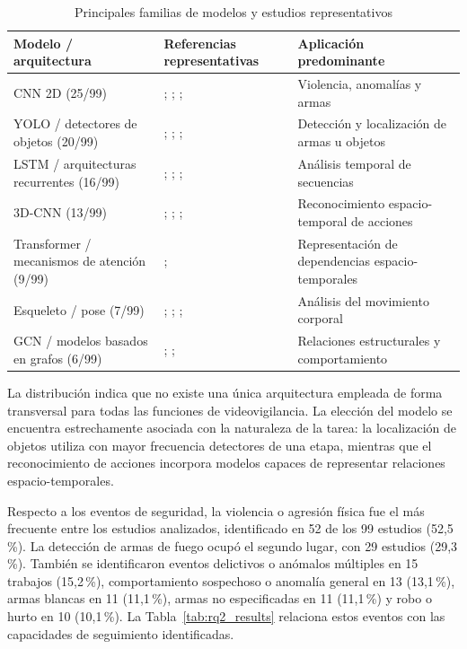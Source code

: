 \documentclass[pdflatex,sn-mathphys-num]{sn-jnl}%
\theoremstyle{thmstyleone}%
\theoremstyle{thmstyletwo}%
\theoremstyle{thmstylethree}%
\begin{document}
\begingroup
\small
\setlength{\tabcolsep}{4pt}
\renewcommand{\arraystretch}{1.15}
\begin{table}[!htbp]
\centering
\caption{Principales familias de modelos y estudios representativos}
\label{tab:rq1_results}
\begin{tabular}{@{}L{3.2cm}L{5.0cm}L{4.1cm}@{}}
\toprule
\textbf{Modelo / arquitectura} & \textbf{Referencias representativas} & \textbf{Aplicación predominante} \\
\midrule
CNN 2D (25/99) & \citet{ciampi2024}; \citet{ingle2022}; \citet{saleem2022}; \citet{pereatrigo2023} & Violencia, anomalías y armas \\
YOLO / detectores de objetos (20/99) & \citet{munoz2025}; \citet{fierrosilva2026}; \citet{fathy2022}; \citet{dalal2024} & Detección y localización de armas u objetos \\
LSTM / arquitecturas recurrentes (16/99) & \citet{singhal2026}; \citet{ciampi2022}; \citet{pangavhane2025}; \citet{azzakhnini2025} & Análisis temporal de secuencias \\
3D-CNN (13/99) & \citet{singhal2026}; \citet{ciampi2022}; \citet{huszar2023}; \citet{shin2025} & Reconocimiento espacio-temporal de acciones \\
Transformer / mecanismos de atención (9/99) & \citet{ciampi2022}; \citet{shin2025} & Representación de dependencias espacio-temporales \\
Esqueleto / pose (7/99) & \citet{bhavani2025}; \citet{janbi2024}; \citet{muriithi2024}; \citet{garciacobo2023} & Análisis del movimiento corporal \\
GCN / modelos basados en grafos (6/99) & \citet{janbi2024}; \citet{g2025}; \citet{leyva2024} & Relaciones estructurales y comportamiento \\
\bottomrule
\end{tabular}
\end{table}
\FloatBarrier
\endgroup

La distribución indica que no existe una única arquitectura empleada de forma
transversal para todas las funciones de videovigilancia. La elección del modelo se
encuentra estrechamente asociada con la naturaleza de la tarea: la localización de
objetos utiliza con mayor frecuencia detectores de una etapa, mientras que el
reconocimiento de acciones incorpora modelos capaces de representar relaciones
espacio-temporales.

\FloatBarrier
Respecto a los eventos de seguridad, la violencia o agresión física fue el más frecuente entre los estudios analizados,
identificado en 52 de los 99 estudios (52,5\,\%). La detección de armas de fuego
ocupó el segundo lugar, con 29 estudios (29,3\,\%). También se identificaron
eventos delictivos o anómalos múltiples en 15 trabajos (15,2\,\%),
comportamiento sospechoso o anomalía general en 13 (13,1\,\%), armas blancas
en 11 (11,1\,\%), armas no especificadas en 11 (11,1\,\%) y robo o hurto en 10 (10,1\,\%).
La Tabla~\ref{tab:rq2_results} relaciona estos eventos con las capacidades de seguimiento identificadas.
\end{document}

